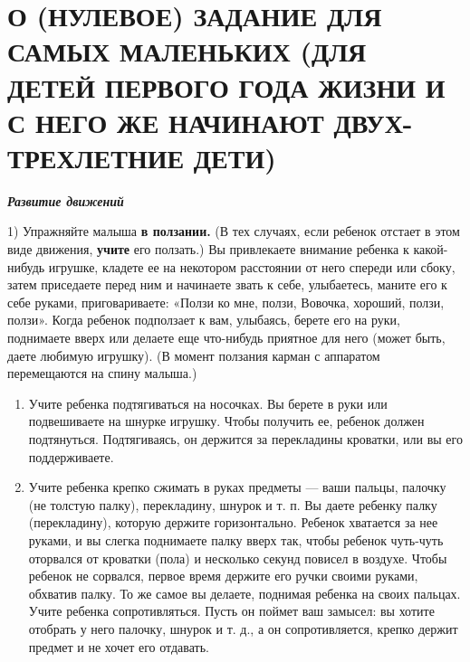 \documentclass[a5paper]{book}
\newcounter{structure}
\renewcommand{\emph}[1]{\textit{#1}}
\begin{document}
\textbf{\hfill\break
}



\section{О (НУЛЕВОЕ) ЗАДАНИЕ ДЛЯ САМЫХ МАЛЕНЬКИХ (ДЛЯ ДЕТЕЙ ПЕРВОГО ГОДА ЖИЗНИ И С НЕГО ЖЕ НАЧИНАЮТ ДВУХ-ТРЕХЛЕТНИЕ ДЕТИ)}

\emph{\textbf{Развитие движений}}

1) Упражняйте малыша \textbf{в ползании.} (В тех случаях, если ребенок
отстает в этом виде движения, \textbf{учите} его ползать.) Вы
привлекаете внимание ребенка к какой-нибудь игрушке, кладете ее на
некотором расстоянии от него спереди или сбоку, затем приседаете перед
ним и начинаете звать к себе, улыбаетесь, маните его к себе руками,
приговариваете: «Ползи ко мне, ползи, Вовочка, хороший, ползи, ползи».
Когда ребенок подползает к вам, улыбаясь, берете его на руки, поднимаете
вверх или делаете еще что-нибудь приятное для него (может быть, даете
любимую игрушку). (В момент ползания карман с аппаратом перемещаются на
спину малыша.)


\begin{enumerate}
\def\labelenumi{\arabic{enumi}.}
\setcounter{enumi}{1}
\item
  
  Учите ребенка подтягиваться на носочках. Вы берете в руки или
  подвешиваете на шнурке игрушку. Чтобы получить ее, ребенок должен
  подтянуться. Подтягиваясь, он держится за перекладины кроватки, или вы
  его поддерживаете.
  
\item
  
  Учите ребенка крепко сжимать в руках предметы --- ваши пальцы, палочку
  (не толстую палку), перекладину, шнурок и т. п. Вы даете ребенку палку
  (перекладину), которую держите горизонтально. Ребенок хватается за нее
  руками, и вы слегка поднимаете палку вверх так, чтобы ребенок
  чуть-чуть оторвался от кроватки (пола) и несколько секунд повисел в
  воздухе. Чтобы ребенок не сорвался, первое время держите его ручки
  своими руками, обхватив палку. То же самое вы делаете, поднимая
  ребенка на своих пальцах. Учите ребенка сопротивляться. Пусть он
  поймет ваш замысел: вы хотите отобрать у него палочку, шнурок и т. д.,
  а он сопротивляется, крепко держит предмет и не хочет его отдавать.
  
\end{enumerate}
\end{document}
